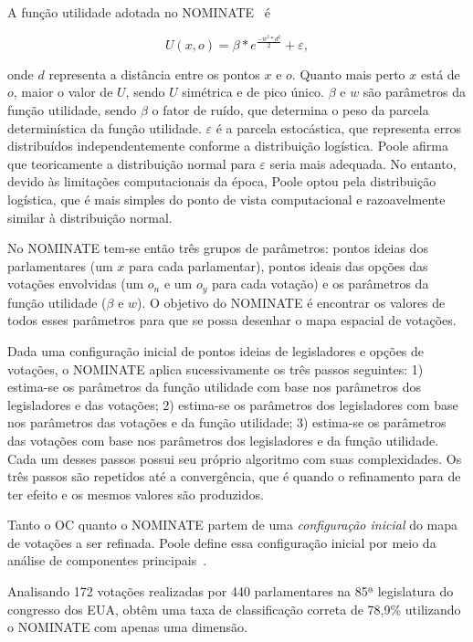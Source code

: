 \documentclass[
	article,			%
	12pt,				%
    twoside,			%
	a4paper,			%
	english,			%
	french,				%
	spanish,			%
	brazil,				%
	]{abntex2}
\newcommand\nominate{NOMINATE\xspace}
\begin{document}
A função utilidade adotada no \nominate~\cite{poole1985nominate} é 

\[ U(x,o) = \beta * e^{\frac{-w^2*d^2}{2}} + \varepsilon,\] 

\noindent
onde $d$ representa a distância entre os pontos $x$ e $o$. Quanto mais perto $x$ está de $o$, maior o valor de $U$, sendo $U$ simétrica e de pico único. $\beta$ e $w$ são parâmetros da função utilidade, sendo $\beta$ o fator de ruído, que determina o peso da parcela determinística da função utilidade. $\varepsilon$ é a parcela estocástica, que representa erros distribuídos independentemente conforme a distribuição logística. Poole afirma que teoricamente a distribuição normal para $\varepsilon$ seria mais adequada. No entanto, devido às limitações computacionais da época, Poole optou pela distribuição logística, que é mais simples do ponto de vista computacional e razoavelmente similar à distribuição normal.

No \nominate tem-se então três grupos de parâmetros: pontos ideias dos parlamentares (um $x$ para cada parlamentar), pontos ideais das opções das votações envolvidas (um $o_n$ e um $o_y$ para cada votação) e os parâmetros da função utilidade ($\beta$ e $w$). O objetivo do \nominate é encontrar os valores de todos esses parâmetros para que se possa desenhar o mapa espacial de votações.

Dada uma configuração inicial de pontos ideias de legisladores e opções de votações, o \nominate aplica sucessivamente os três passos seguintes: 1) estima-se os parâmetros da função utilidade com base nos parâmetros dos legisladores e das votações; 2) estima-se os parâmetros dos legisladores com base nos parâmetros das votações e da função utilidade; 3) estima-se os parâmetros das votações com base nos parâmetros dos legisladores e da função utilidade. Cada um desses passos possui seu próprio algoritmo com suas complexidades. Os três passos são repetidos até a convergência, que é quando o refinamento para de ter efeito e os mesmos valores são produzidos.

Tanto o OC quanto o \nominate partem de uma \emph{configuração inicial} do mapa de votações a ser refinada. Poole define essa configuração inicial por meio da análise de componentes principais~\cite{poole2005book}.

Analisando 172 votações realizadas por 440 parlamentares na 85ª legislatura do congresso dos EUA,  obtêm uma taxa de classificação correta de 78,9\% utilizando o \nominate com apenas uma dimensão.
\end{document}

